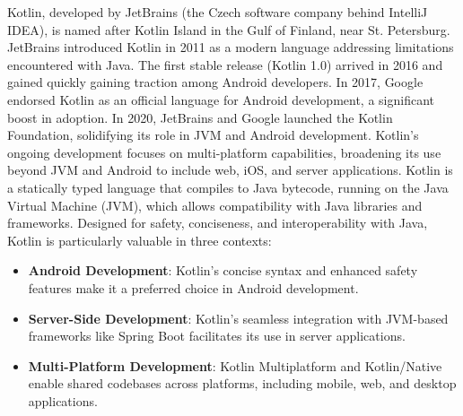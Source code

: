 Kotlin, developed by JetBrains (the Czech software company behind IntelliJ IDEA), is named after Kotlin Island in the Gulf of Finland, near St. Petersburg. JetBrains introduced Kotlin in 2011 as a modern language addressing limitations encountered with Java. The first stable release (Kotlin 1.0) arrived in 2016 and gained quickly gaining traction among Android developers. In 2017, Google endorsed Kotlin as an official language for Android development, a significant boost in adoption. In 2020, JetBrains and Google launched the Kotlin Foundation, solidifying its role in JVM and Android development. Kotlin’s ongoing development focuses on multi-platform capabilities, broadening its use beyond JVM and Android to include web, iOS, and server applications. Kotlin is a statically typed language that compiles to Java bytecode, running on the Java Virtual Machine (JVM), which allows compatibility with Java libraries and frameworks. Designed for safety, conciseness, and interoperability with Java, Kotlin is particularly valuable in three contexts:

\begin{itemize}
    \item \textbf{Android Development}: Kotlin’s concise syntax and enhanced safety features make it a preferred choice in Android development.
    \item \textbf{Server-Side Development}: Kotlin’s seamless integration with JVM-based frameworks like Spring Boot facilitates its use in server applications.
    \item \textbf{Multi-Platform Development}: Kotlin Multiplatform and Kotlin/Native enable shared codebases across platforms, including mobile, web, and desktop applications.
\end{itemize}

